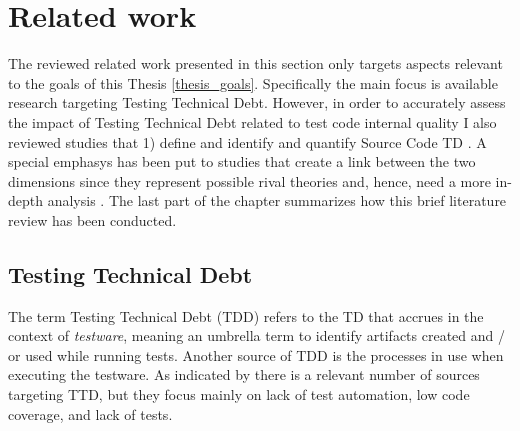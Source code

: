 \chapter{Related work}

The reviewed related work presented in this section only targets aspects relevant to the goals of this Thesis \ref{thesis_goals}. Specifically the main focus is available research targeting Testing Technical Debt. However, in order to accurately assess the impact of Testing Technical Debt related to test code internal quality I also reviewed studies that 1) define and identify and quantify Source Code TD \cite{mapping_study_td}. A special emphasys has been put to studies that create a link between the two dimensions since they represent possible rival theories and, hence, need a more in-depth analysis \cite{case_study_guide}. The last part of the chapter summarizes how this brief literature review has been conducted.

\section{Testing Technical Debt} \label{testing_td}

The term Testing Technical Debt (TDD) refers to the TD that accrues in the context of \textit{testware}, meaning an umbrella term to identify artifacts created and / or used while running tests. Another source of TDD is the processes in use when executing the testware. As indicated by \cite{mapping_study_td, exploration_of_td, exploration_of_td2} there is a relevant number of sources targeting TTD, but they focus mainly on lack of test automation, low code coverage, and lack of tests.

